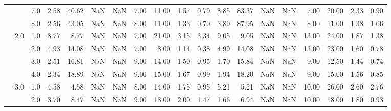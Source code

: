 \begin{tabular}{lllrrrrrrrrrrrrrrrr}
          &     & 7.0  &      2.58 &      40.62 &               NaN &                NaN &  7.00 &  11.00 &             1.57 &                         0.79 &      8.85 &      83.37 &               NaN &                NaN &  7.00 &  20.00 &             2.33 &                         0.90 \\
          &     & 8.0  &      2.56 &      43.05 &               NaN &                NaN &  8.00 &  11.00 &             1.33 &                         0.70 &      3.89 &      87.95 &               NaN &                NaN &  8.00 &  11.00 &             1.38 &                         1.06 \\
          & 2.0 & 1.0  &      8.77 &       8.77 &               NaN &                NaN &  7.00 &  21.00 &             3.15 &                         3.34 &      9.05 &       9.05 &               NaN &                NaN & 13.00 &  24.00 &             1.87 &                         1.38 \\
          &     & 2.0  &      4.93 &      14.08 &               NaN &                NaN &  7.00 &   8.00 &             1.14 &                         0.38 &      4.99 &      14.08 &               NaN &                NaN & 13.00 &  23.00 &             1.60 &                         0.78 \\
          &     & 3.0  &      2.51 &      16.81 &               NaN &                NaN &  9.00 &  14.00 &             1.50 &                         0.95 &      1.70 &      15.84 &               NaN &                NaN &  9.00 &  12.50 &             1.44 &                         0.74 \\
          &     & 4.0  &      2.34 &      18.89 &               NaN &                NaN &  9.00 &  15.00 &             1.67 &                         0.99 &      1.94 &      18.20 &               NaN &                NaN &  9.00 &  15.00 &             1.56 &                         0.85 \\
          & 3.0 & 1.0  &      4.58 &       4.58 &               NaN &                NaN &  8.00 &  14.00 &             1.75 &                         0.95 &      5.21 &       5.21 &               NaN &                NaN & 10.00 &  26.00 &             2.60 &                         2.76 \\
          &     & 2.0  &      3.70 &       8.47 &               NaN &                NaN &  9.00 &  18.00 &             2.00 &                         1.47 &      1.66 &       6.94 &               NaN &                NaN & 10.00 &  18.00 &             1.80 &                         0.93 \\

\end{tabular}
